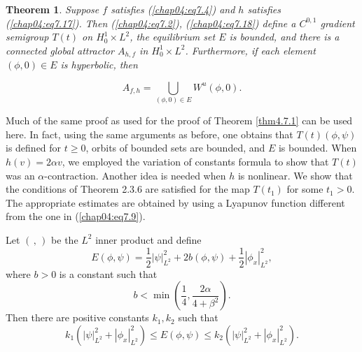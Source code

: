\documentclass{surv-l}
\theoremstyle{plain}
\newtheorem{theorem}{Theorem}[section]
\theoremstyle{definition}
\numberwithin{equation}{section}
\numberwithin{figure}{chapter}
\begin{document}
\begin{theorem}\label{thm4.7.8} Suppose $f$ satisfies \emph{(\ref{chap04:eq7.4})} and $h$ satisfies \emph{(\ref{chap04:eq7.17})}. Then \emph{(\ref{chap04:eq7.2}), (\ref{chap04:eq7.18})} define a $C^{0,1}$ gradient semigroup $T(t)$ on $H_{0}^{1}\times L^{2}$, the equilibrium
set $E$ is bounded, and there is a connected global attractor $A_{h,f}$ in $H_{0}^{1}\times L^{2}$. Furthermore, if each element $(\phi, 0)\in E$ is hyperbolic, then \end{theorem}
\begin{equation*}
A_{f,h}=\bigcup_{(\phi,0)\in E} W^{u}(\phi, 0).
\end{equation*}

Much of the same proof as used for the proof of Theorem \ref{thm4.7.1} can be used here. In fact, using the same arguments as before, one obtains that $T(t)(\phi, \psi)$ is defined for $t\geq 0$, orbits of bounded sets are bounded, and $E$ is bounded. When $h(v)=2\alpha v$, we employed the variation of constants formula to show that $T(t)$ was an $\alpha$-contraction. Another idea is needed when $h$ is nonlinear. We show that the conditions of Theorem 2.3.6 are satisfied for the map $T(t_{1})$ for some $t_{1}>0$. The appropriate estimates are obtained by using a Lyapunov function different from the one in (\ref{chap04:eq7.9}).

Let $(\,{,}\,)$ be the $L^{2}$ inner product and define
\begin{equation}\label{chap04:eq7.19}
E(\phi, \psi)=\frac{1}{2}|\psi|_{L^{2}}^{2}+2b(\phi, \psi)+\frac{1}{2}|\phi_{x}|_{L^{2}}^{2},
\end{equation}
where $b>0$ is a constant such that
\begin{equation}\label{chap04:eq7.20}
b<\min\left(\frac{1}{4}, \frac{2\alpha}{4+\beta^{2}}\right).
\end{equation}
Then there are positive constants $k_{1}, k_{2}$ such that
\begin{equation}\label{chap04:eq7.21}
k_{1}(|\psi|_{L^{2}}^{2}+|\phi_{x}|_{L^{2}}^{2})\leq E(\phi, \psi)\leq k_{2}(|\psi|_{L^{2}}^{2}+|\phi_{x}|_{L^{2}}^{2}).
\end{equation}
\end{document}
